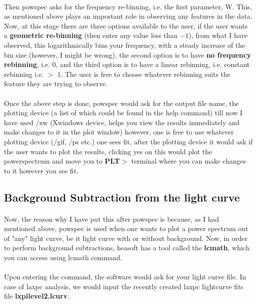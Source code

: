 \documentclass[a4paper,twoside]{report}
\numberwithin{equation}{section}
\begin{document}
\paragraph{}
Then powspec asks for the frequency re-binning, i.e. the first parameter, W. This, as mentioned above plays an important role in observing any features in the data. Now, at this stage there are three options available to the user, if the user wants a \textbf{geometric re-binning} (then enter any value less than $-1$), from what I have observed, this logarithmically bins your frequency, with a steady increase of the bin size (however, I might be wrong), the second option is to have \textbf{no frequency rebinning}, i.e. $0$, and the third option is to have a linear rebinning, i.e. constant rebinning i.e. $>$ $1$. The user is free to choose whatever rebinning suits the feature they are trying to observe. 
\paragraph{}
Once the above step is done, powspec would ask for the output file name, the plotting device (a list of which could be found in the help command) till now I have used /xw (Xwindows device, helps you view the results immediately and make changes to it in the plot window) however, one is free to use whatever plotting device (/gif, /ps etc.) one sees fit, after the plotting device it would ask if the user wants to plot the results, clicking yes on this would plot the powerspectrum and move you to \textbf{PLT$>$} terminal where you can make changes to it however you see fit. 
\subsection{Background Subtraction from the light curve}
\paragraph{}
Now, the reason why I have put this after powspec is because, as I had mentioned above, powspec is used when one wants to plot a power spectrum out of "any" light curve, be it light curve with or without background. Now, in order to perform background subtractions, heasoft has a tool called the \textbf{lcmath}, which you can access using lcmath command. 
\paragraph{}
Upon entering the command, the software would ask for your light curve file. In case of laxpc analysis, we would input the recently created laxpc lightcurve fits file \textbf{lxpilevel2.lcurv}. 
\end{document}
